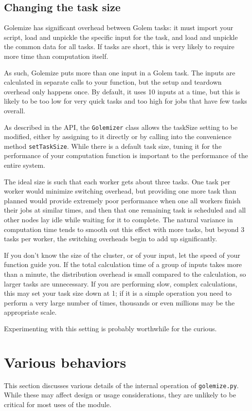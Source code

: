 \documentclass[11pt,ebook,oneside,final]{memoir} %
\begin{document}
\section{Changing the task size}
Golemize has significant overhead between Golem tasks: it must import your script, load and unpickle the specific input for the task, and load and unpickle the common data for all tasks. If tasks are short, this is very likely to require more time than computation itself.

As such, Golemize puts more than one input in a Golem task. The inputs are calculated in separate calls to your function, but the setup and teardown overhead only happens once. By default, it uses 10 inputs at a time, but this is likely to be too low for very quick tasks and too high for jobs that have few tasks overall.

As described in the API, the \texttt{Golemizer} class allows the taskSize setting to be modified, either by assigning to it directly or by calling into the convenience method \texttt{setTaskSize}. While there is a default task size, tuning it for the performance of your computation function is important to the performance of the entire system.

The ideal size is such that each worker gets about three tasks. One task per worker would minimize switching overhead, but providing one more task than planned would provide extremely poor performance when one all workers finish their jobs at similar times, and then that one remaining task is scheduled and all other nodes lay idle while waiting for it to complete. The natural variance in computation time tends to smooth out this effect with more tasks, but beyond 3 tasks per worker, the switching overheads begin to add up significantly.

If you don't know the size of the cluster, or of your input, let the speed of your function guide you. If the total calculation time of a group of inputs takes more than a minute, the distribution overhead is small compared to the calculation, so larger tasks are unnecessary. If you are performing slow, complex calculations, this may set your task size down at 1; if it is a simple operation you need to perform a very large number of times, thousands or even millions may be the appropriate scale.

Experimenting with this setting is probably worthwhile for the curious.

\chapter{Various behaviors}
This section discusses various details of the internal operation of \texttt{golemize.py}. While these may affect design or usage considerations, they are unlikely to be critical for most uses of the module.
\end{document}
